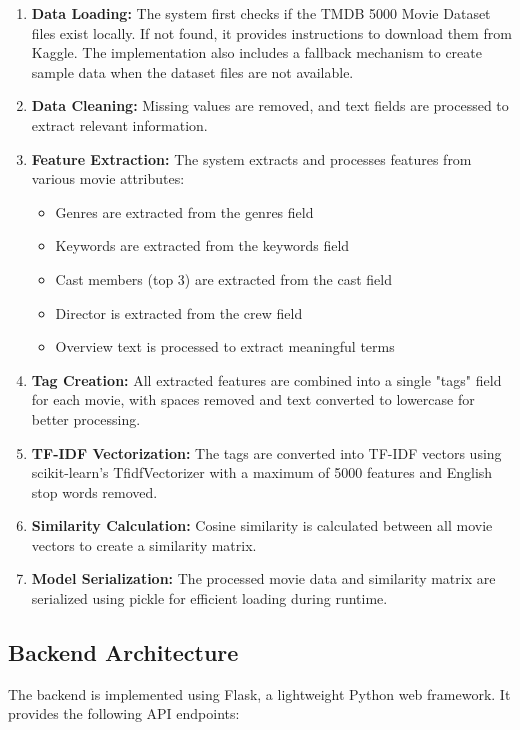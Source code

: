 \documentclass[12pt,a4paper]{article}
\begin{document}
\begin{enumerate}
    \item \textbf{Data Loading:} The system first checks if the TMDB 5000 Movie Dataset files exist locally. If not found, it provides instructions to download them from Kaggle. The implementation also includes a fallback mechanism to create sample data when the dataset files are not available.
    \item \textbf{Data Cleaning:} Missing values are removed, and text fields are processed to extract relevant information.
    \item \textbf{Feature Extraction:} The system extracts and processes features from various movie attributes:
    \begin{itemize}
        \item Genres are extracted from the genres field
        \item Keywords are extracted from the keywords field
        \item Cast members (top 3) are extracted from the cast field
        \item Director is extracted from the crew field
        \item Overview text is processed to extract meaningful terms
    \end{itemize}
    \item \textbf{Tag Creation:} All extracted features are combined into a single "tags" field for each movie, with spaces removed and text converted to lowercase for better processing.
    \item \textbf{TF-IDF Vectorization:} The tags are converted into TF-IDF vectors using scikit-learn's TfidfVectorizer with a maximum of 5000 features and English stop words removed.
    \item \textbf{Similarity Calculation:} Cosine similarity is calculated between all movie vectors to create a similarity matrix.
    \item \textbf{Model Serialization:} The processed movie data and similarity matrix are serialized using pickle for efficient loading during runtime.
\end{enumerate}

\subsection{Backend Architecture}

The backend is implemented using Flask, a lightweight Python web framework. It provides the following API endpoints:
\end{document}

